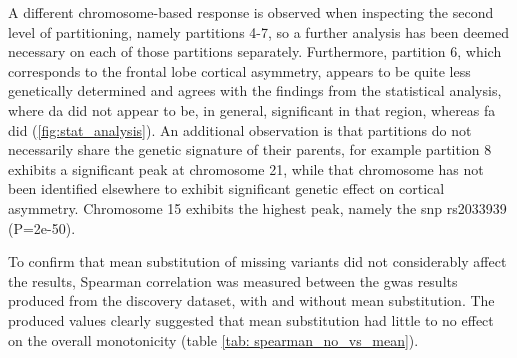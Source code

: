A different chromosome-based response is observed when inspecting the second level of partitioning, namely partitions 4-7, so a further analysis has been deemed necessary on each of those partitions separately. Furthermore, partition 6, which corresponds to the frontal lobe cortical asymmetry, appears to be quite less genetically determined and agrees with the findings from the statistical analysis, where \ac{da} did not appear to be, in general, significant in that region, whereas \ac{fa} did (\autoref{fig:stat_analysis}). An additional observation is that partitions do not necessarily share the genetic signature of their parents, for example partition 8 exhibits a significant peak at chromosome 21, while that chromosome has not been identified elsewhere to exhibit significant genetic effect on cortical asymmetry.  Chromosome 15 exhibits the highest peak, namely the \ac{snp} rs2033939 (P=2e-50). 

To confirm that mean substitution of missing variants did not considerably affect the results, Spearman correlation was measured between the \ac{gwas} results produced from the discovery dataset, with and without mean substitution. The produced values clearly suggested that mean substitution had little to no effect on the overall monotonicity (table \autoref{tab: spearman_no_vs_mean}).

